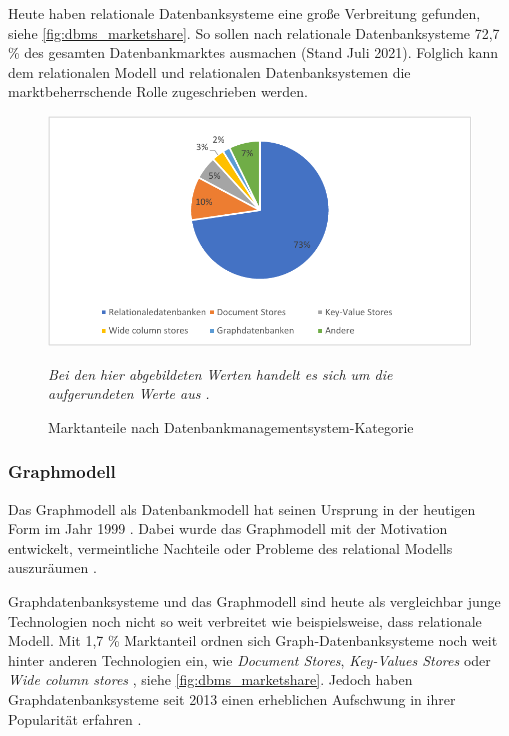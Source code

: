 Heute haben relationale Datenbanksysteme eine große Verbreitung gefunden, siehe \autoref{fig:dbms_marketshare}. So sollen nach \cite{db_engines_ranking_july} relationale Datenbanksysteme 72,7 \% des gesamten Datenbankmarktes ausmachen (Stand Juli 2021). Folglich kann dem relationalen Modell und relationalen Datenbanksystemen die marktbeherrschende Rolle zugeschrieben werden.

\begin{figure}[ht]
    \centering
    \includegraphics[width=\textwidth]{images/marketshare_dbms.pdf}
    \caption{Marktanteile nach Datenbankmanagementsystem-Kategorie}
    \label{fig:dbms_marketshare}
    \vspace{1em}
    \textit{Bei den hier abgebildeten Werten handelt es sich um die aufgerundeten Werte aus} \cite{db_engines_ranking_july}\textit{.}
\end{figure}

\subsubsection{Graphmodell}
Das Graphmodell als Datenbankmodell hat seinen Ursprung in der heutigen Form im Jahr 1999 \cite{gdbms}. Dabei wurde das Graphmodell mit der Motivation entwickelt, vermeintliche Nachteile oder Probleme des relational Modells auszuräumen \cite{gdbms}.

Graphdatenbanksysteme und das Graphmodell sind heute als vergleichbar junge Technologien noch nicht so weit verbreitet wie beispielsweise, dass relationale Modell. Mit 1,7 \% Marktanteil ordnen sich Graph-Datenbanksysteme noch weit hinter anderen Technologien ein, wie \textit{Document Stores}, \textit{Key-Values Stores} oder \textit{Wide column stores} \cite{db_engines_ranking_july}, siehe \autoref{fig:dbms_marketshare}. Jedoch haben Graphdatenbanksysteme seit 2013 einen erheblichen Aufschwung in ihrer Popularität erfahren \cite{db_engines_ranking_july}. 


